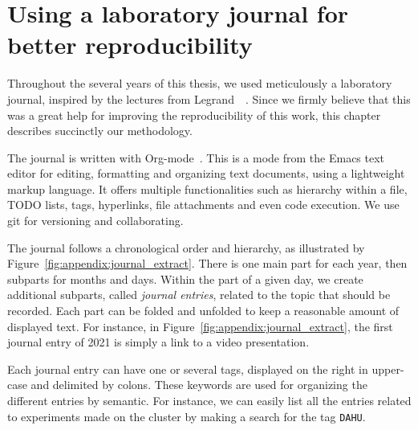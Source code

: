 \chapter{Using a laboratory journal for better reproducibility}
\label{chapter:orgmode}

    Throughout the several years of this thesis, we used meticulously a laboratory journal, inspired by the lectures
    from Legrand~\etal~\cite{RR_mooc,SMPE_course}. Since we firmly believe that this was a great help for improving the
    reproducibility of this work, this chapter describes succinctly our methodology.

    The journal is written with Org-mode~\cite{orgmode}. This is a mode from the Emacs text editor for editing,
    formatting and organizing text documents, using a lightweight markup language. It offers multiple functionalities
    such as hierarchy within a file, TODO lists, tags, hyperlinks, file attachments and even code execution. We use git
    for versioning and collaborating.

    The journal follows a chronological order and hierarchy, as illustrated by
    Figure~\ref{fig:appendix:journal_extract}. There is one main part for each year, then subparts for months and days.
    Within the part of a given day, we create additional subparts, called \emph{journal entries}, related to the topic
    that should be recorded. Each part can be folded and unfolded to keep a reasonable amount of displayed text. For
    instance, in Figure~\ref{fig:appendix:journal_extract}, the first journal entry of 2021 is simply a link to a video
    presentation.

    Each journal entry can have one or several tags, displayed on the right in upper-case and delimited by colons. These
    keywords are used for organizing the different entries by semantic. For instance, we can easily list all the
    entries related to experiments made on the \dahu cluster by making a search for the tag \texttt{DAHU}.

